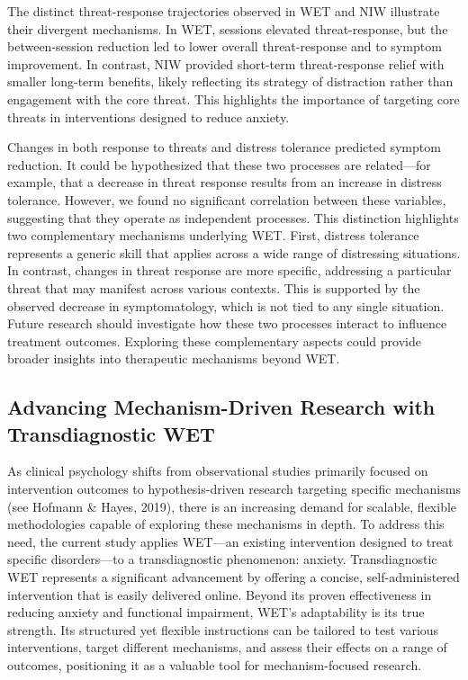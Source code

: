 \documentclass[
  man,floatsintext]{apa7}
\begin{document}
The distinct threat-response trajectories observed in WET and NIW illustrate their divergent mechanisms.
In WET, sessions elevated threat-response, but the between-session reduction led to lower overall threat-response and to symptom improvement.
In contrast, NIW provided short-term threat-response relief with smaller long-term benefits, likely reflecting its strategy of distraction rather than engagement with the core threat.
This highlights the importance of targeting core threats in interventions designed to reduce anxiety.

Changes in both response to threats and distress tolerance predicted symptom reduction.
It could be hypothesized that these two processes are related---for example, that a decrease in threat response results from an increase in distress tolerance.
However, we found no significant correlation between these variables, suggesting that they operate as independent processes.
This distinction highlights two complementary mechanisms underlying WET.
First, distress tolerance represents a generic skill that applies across a wide range of distressing situations.
In contrast, changes in threat response are more specific, addressing a particular threat that may manifest across various contexts.
This is supported by the observed decrease in symptomatology, which is not tied to any single situation.
Future research should investigate how these two processes interact to influence treatment outcomes.
Exploring these complementary aspects could provide broader insights into therapeutic mechanisms beyond WET.

\subsection{Advancing Mechanism-Driven Research with Transdiagnostic WET}\label{advancing-mechanism-driven-research-with-transdiagnostic-wet}

As clinical psychology shifts from observational studies primarily focused on intervention outcomes to hypothesis-driven research targeting specific mechanisms (see Hofmann \& Hayes, 2019), there is an increasing demand for scalable, flexible methodologies capable of exploring these mechanisms in depth.
To address this need, the current study applies WET---an existing intervention designed to treat specific disorders---to a transdiagnostic phenomenon: anxiety.
Transdiagnostic WET represents a significant advancement by offering a concise, self-administered intervention that is easily delivered online.
Beyond its proven effectiveness in reducing anxiety and functional impairment, WET's adaptability is its true strength.
Its structured yet flexible instructions can be tailored to test various interventions, target different mechanisms, and assess their effects on a range of outcomes, positioning it as a valuable tool for mechanism-focused research.
\end{document}
